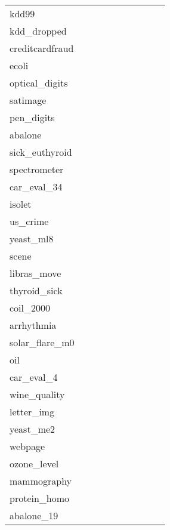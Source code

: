 \begin{table}[hbtb]
\begin{tabular}{l*{9}{r}}
        kdd99 &&&&&&&& \\
        kdd\_dropped &&&&&&&& \\
        creditcardfraud &&&&&&&& \\
        ecoli &&&&&&&& \\
        optical\_digits &&&&&&&& \\
        satimage &&&&&&&& \\
        pen\_digits &&&&&&&& \\
        abalone &&&&&&&& \\
        sick\_euthyroid &&&&&&&& \\
        spectrometer &&&&&&&& \\
        car\_eval\_34 &&&&&&&& \\
        isolet &&&&&&&& \\
        us\_crime &&&&&&&& \\
        yeast\_ml8 &&&&&&&& \\
        scene &&&&&&&& \\
        libras\_move &&&&&&&& \\
        thyroid\_sick &&&&&&&& \\
        coil\_2000 &&&&&&&& \\
        arrhythmia &&&&&&&& \\
        solar\_flare\_m0 &&&&&&&& \\
        oil &&&&&&&& \\
        car\_eval\_4 &&&&&&&& \\
        wine\_quality &&&&&&&& \\
        letter\_img &&&&&&&& \\
        yeast\_me2 &&&&&&&& \\
        webpage &&&&&&&& \\
        ozone\_level &&&&&&&& \\
        mammography &&&&&&&& \\
        protein\_homo &&&&&&&& \\
        abalone\_19 &&&&&&&& \\
        \hline
    \end{tabular}

\end{table}

